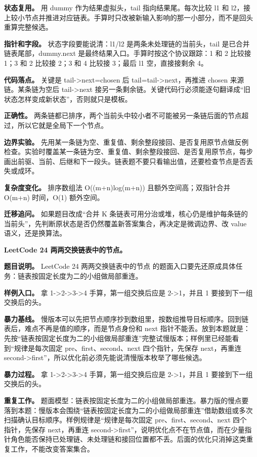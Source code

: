 \textbf{状态复用。} 用 dummy 作为结果虚拟头，tail 指向结果尾。每次比较 l1 和 l2，接上较小节点并推进对应链表。手算时只改被新输入影响的那一小部分，而不是回头重算完整候选。

\textbf{指针和字段。} 状态字段要能说清：l1/l2 是两条未处理链的当前头，tail 是已合并链表尾部，dummy.next 是最终结果入口。手算时按这个协议跟踪：1 和 2 比较接 1；3 和 2 比较接 2；3 和 4 比较接 3；最后 l1 空，直接接剩余 4。

\textbf{代码落点。} 关键是 tail->next=chosen 后 tail=tail->next，再推进 chosen 来源链。某条链为空后 tail->next 接另一条剩余链。关键代码行必须能逐句翻译成“旧状态怎样变成新状态”，否则就只是模板。

\textbf{正确性。} 两条链都已排序，两个当前头中较小者不可能被另一条链后面的节点超过，所以它就是全局下一个节点。

\textbf{边界实验。} 先用某一条链为空、重复值、剩余整段接回、是否复用原节点做反例检查。实验时覆盖某一条链为空、重复值、剩余整段接回、是否复用原节点，每步画出前驱、当前、后继和下一段头。链表题不要只看输出值，还要检查节点是否丢失或成环。

\textbf{复杂度变化。} 排序数组法 O((m+n)log(m+n)) 且额外空间高；双指针合并 O(m+n) 时间，O(1) 额外空间。

\textbf{迁移追问。} 如果题目改成“合并 K 条链表可用分治或堆，核心仍是维护每条链的当前头”，先判断原状态是否仍然覆盖新答案集合，再决定是微调边界、改 value 语义，还是换算法。

\noindent\textbf{LeetCode 24 两两交换链表中的节点。}

\textbf{题目说明。} LeetCode 24 两两交换链表中的节点 的题面入口要先还原成具体任务：链表按固定长度为二的小组做局部重连。

\textbf{样例入口。} 拿 1->2->3->4 手算，第一组交换后应是 2->1，并且 1 要接到下一组交换后的头。

\textbf{暴力基线。} 慢版本可以先把节点顺序抄到数组里，按数组推导目标顺序。回到链表后，难点不再是值的顺序，而是节点身份和 next 指针不能丢。放到本题就是：先按“链表按固定长度为二的小组做局部重连”完整试慢版本；样例里已经能看到“规律是每次固定 pre、first、second、next 四个指针，先保存 next，再重连 second->first”，所以优化前必须先能说清慢版本枚举了哪些候选。

\textbf{暴力过程。} 拿 1->2->3->4 手算，第一组交换后应是 2->1，并且 1 要接到下一组交换后的头。

\textbf{重复工作。} 题面模型：链表按固定长度为二的小组做局部重连。暴力版的慢点要落到本题：慢版本会围绕“链表按固定长度为二的小组做局部重连”借助数组或多次扫描确认目标顺序。样例规律是“规律是每次固定 pre、first、second、next 四个指针，先保存 next，再重连 second->first”，说明优化点不在节点值，而在少量指针角色能否保持已处理链、未处理链和接回位置都不丢。后面的优化只消掉这类重复工作，不能改变答案集合。


